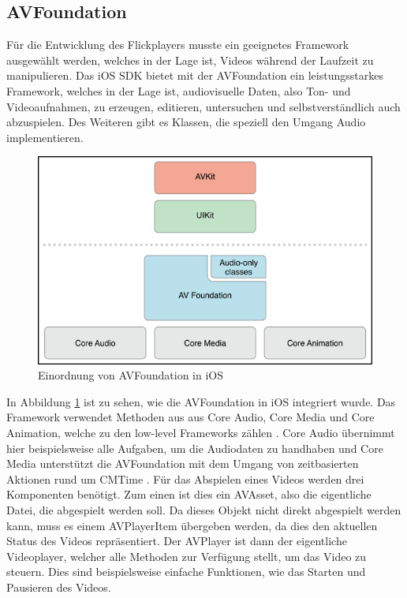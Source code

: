 \documentclass[11pt,a4paper]{report}
\begin{document}
\subsection{AVFoundation}

Für die Entwicklung des Flickplayers musste ein geeignetes Framework ausgewählt werden, welches in der Lage ist, Videos während der Laufzeit zu manipulieren. Das iOS SDK bietet mit der AVFoundation ein leistungsstarkes Framework, welches in der Lage ist, audiovisuelle Daten, also Ton- und Videoaufnahmen, zu erzeugen, editieren, untersuchen und selbstverständlich auch abzuspielen. Des Weiteren gibt es Klassen, die speziell den Umgang Audio implementieren.
\begin{figure}[h]
\begin{center}
\includegraphics[scale=1.1]{./images/22.png}
\caption{Einordnung von AVFoundation in iOS \cite{AboutAVFoundation}}
\label{AVFoundation}
\end{center}
\end{figure}
In Abbildung \ref{AVFoundation} ist zu sehen, wie die AVFoundation in iOS integriert wurde. Das Framework verwendet Methoden aus aus Core Audio, Core Media und Core Animation, welche zu den low-level Frameworks zählen \cite{AboutAVFoundation}. Core Audio übernimmt hier beispielsweise alle Aufgaben, um die Audiodaten zu handhaben und Core Media unterstützt die AVFoundation mit dem Umgang von zeitbasierten Aktionen rund um CMTime \cite{mccune2014learning}. Für das Abspielen eines Videos werden drei Komponenten benötigt. Zum einen ist dies ein AVAsset, also die eigentliche Datei, die abgespielt werden soll. Da dieses Objekt nicht direkt abgespielt werden kann, muss es einem AVPlayerItem übergeben werden, da dies den aktuellen Status des Videos repräsentiert. Der AVPlayer ist dann der eigentliche Videoplayer, welcher alle Methoden zur Verfügung stellt, um das Video zu steuern. Dies sind beispielsweise einfache Funktionen, wie das Starten und Pausieren des Videos.
\end{document}
